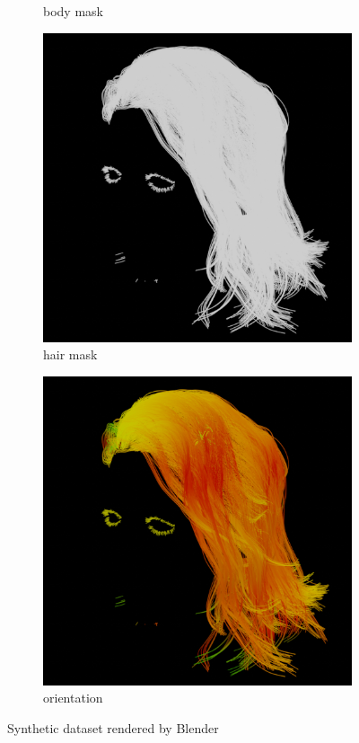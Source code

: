 \documentclass{article}
\begin{document}
\begin{figure}[h]
\begin{subfigure}{0.11\textwidth}
		\caption{body mask}
	\end{subfigure}
	\hfill
	\begin{subfigure}{0.11\textwidth}
		\centering
		\includegraphics[width=\textwidth]{./images/dataset/0009_hairmask.png}
		\caption{hair mask}
	\end{subfigure}
	\hfill
	\begin{subfigure}{0.11\textwidth}
        \centering
        \includegraphics[width=\textwidth]{./images/dataset/0009_hairdir.png}
        \caption{orientation}
	\end{subfigure}

	\caption{Synthetic dataset rendered by Blender}
	\label{fig:dataset}
\end{figure}
\end{document}
